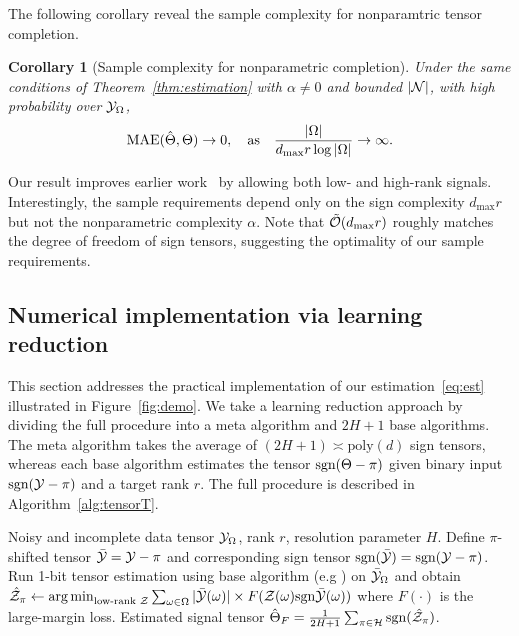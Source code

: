 \documentclass{article}
\theoremstyle{plain}
\newtheorem{cor}{Corollary}
\theoremstyle{definition}
\def\sign{\textup{sgn}}
\begin{document}
The following corollary reveal the sample complexity for nonparamtric tensor completion. 
\begin{cor}[Sample complexity for nonparametric completion] Under the same conditions of Theorem~\ref{thm:estimation} with $\alpha\neq 0$ and bounded $|\mathcal{N}|$, with high probability over $\mathcal{Y}_\Omega$, 
\[
\textup{MAE}(\hat \Theta, \Theta)\to 0, \quad \text{as}\quad {|\Omega|\over {d_{\max}r} \log |\Omega|}\to \infty.
\]
\end{cor}
\vspace{-.2cm}
Our result improves earlier work~\citep{yuan2016tensor,ghadermarzy2019near,pmlr-v119-lee20i} by allowing both low- and high-rank signals. Interestingly, the sample requirements depend only on the sign complexity $d_{\max}r$ but not the nonparametric complexity $\alpha$. Note that $\tilde {\mathcal{O}}(d_{\max}r)$ roughly matches the degree of freedom of sign tensors, suggesting the optimality of our sample requirements. 

\subsection{Numerical implementation via learning reduction}
This section addresses the practical implementation of our estimation~\eqref{eq:est} illustrated in Figure~\ref{fig:demo}. We take a learning reduction approach by dividing the full procedure into a meta algorithm and $2H+1$ base algorithms. The meta algorithm takes the average of $(2H+1)\asymp \text{poly}(d)$ sign tensors, whereas each base algorithm estimates the tensor $\sign(\Theta-\pi)$ given binary input $\sign(\tY-\pi)$ and a target rank $r$. The full procedure is described in Algorithm~\ref{alg:tensorT}.


\vspace{-.3cm}
\begin{algorithm}[h!]
  \caption{Nonparametric tensor completion via learning reduction}\label{alg:tensorT}
 \begin{algorithmic}[1] 
\INPUT Noisy and incomplete data tensor $\mathcal{Y}_\Omega$, rank $r$, resolution parameter $H$.
\State Define $\pi$-shifted tensor $\bar {\mathcal{Y}}=\mathcal{Y}-\pi$ and corresponding sign tensor $\sign(\bar \tY)=\sign(\tY-\pi)$. 
\State Run 1-bit tensor estimation using base algorithm (e.g \citep{ghadermarzy2018learning,wang2018learning,hong2020generalized,alquier2019estimation}) on $\bar {\mathcal{Y}}_\Omega$ and obtain $\hat \tZ_\pi\leftarrow \argmin_{\text{low-rank }\tZ}\sum_{\omega\in \Omega} |\bar \tY(\omega)|\times F(\tZ(\omega)\sign\bar \tY(\omega))$ where $F(\cdot)$ is the large-margin loss.
\EndFor
\OUTPUT Estimated signal tensor $\hat \Theta_F={1\over 2H+1}\sum_{\pi \in \tH}\sign(\hat \tZ_\pi)$.
\vspace{-.1cm}
    \end{algorithmic}
\end{algorithm}
\vspace{-.3cm}
\end{document}
